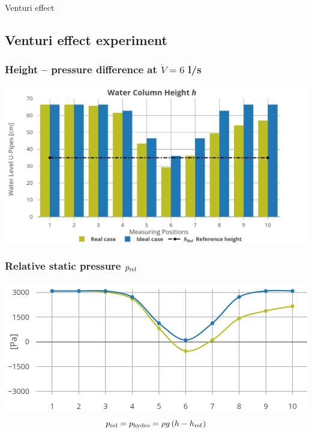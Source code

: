 \documentclass{article}
\begin{document}
\newpage
\begin{multicols}{2}
\setlength{\columnsep}{1pt}

\begin{examplebox}{Venturi effect}
    \subsection{Venturi effect experiment}
    \subsubsection{Height -- pressure difference at $\dot{V} = 6$ l/s}
    \includegraphics[width=\textwidth]{media/venturi.png}

    \subsubsection{Relative static pressure $p_{\rm rel}$}
    \includegraphics[width=\textwidth]{media/venturi_relative.png}
    \vspace*{-0.3cm}
    \begin{equation}
        p_{\rm rel} = p_{\rm hydro} = \rho g \left(h-h_{\rm ref}\right)
    \end{equation}

\end{examplebox}
\end{multicols}
\end{document}
